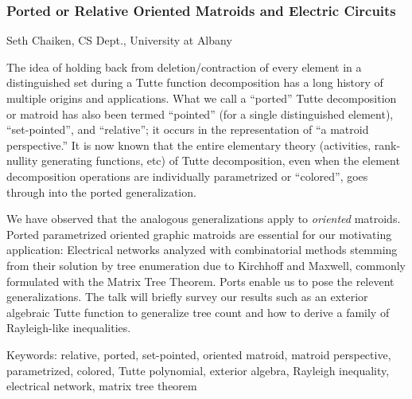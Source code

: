 \documentclass[12pt]{article}
\begin{document}
 
  \subsubsection*{Ported or Relative Oriented Matroids and Electric Circuits}

  Seth Chaiken, CS Dept., University at Albany
  \medskip

The idea of holding back from deletion/contraction of every element
in a distinguished set during a Tutte function decomposition has a long 
history of multiple origins and applications.  
What we call a ``ported'' Tutte decomposition or matroid has also been 
termed ``pointed'' (for a single distinguished element), ``set-pointed'', 
and ``relative''; it occurs in the representation of 
``a matroid perspective.''  
It is now known that the entire elementary theory (activities, rank-nullity
generating functions, etc) of 
Tutte decomposition, even when the element decomposition operations
are individually parametrized or ``colored'', 
goes through into the ported generalization.

We have observed that the analogous generalizations apply to 
\emph{oriented} matroids.  Ported parametrized 
oriented graphic matroids are essential 
for our 
motivating application: Electrical networks analyzed with combinatorial 
methods stemming from their solution by tree enumeration due to Kirchhoff and 
Maxwell, commonly formulated with the Matrix Tree Theorem.  Ports 
enable us to pose the relevent generalizations.  The talk will
briefly survey our results such as an exterior algebraic Tutte function 
to generalize tree count and how to derive a family of 
Rayleigh-like inequalities.   


  \medskip

Keywords:  relative, ported, set-pointed, oriented matroid, matroid perspective,
parametrized, colored, Tutte polynomial, exterior algebra, Rayleigh inequality, 
electrical network, matrix tree theorem
\end{document}
